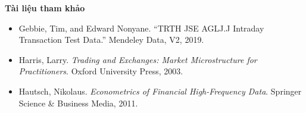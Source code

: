 \textbf{Tài liệu tham khảo}

\begin{itemize}
  \item Gebbie, Tim, and Edward Nonyane. ``TRTH JSE AGLJ.J Intraday Transaction Test Data.'' Mendeley Data, V2, 2019.
  \item Harris, Larry. \emph{Trading and Exchanges: Market Microstructure for Practitioners}. Oxford University Press, 2003.
  \item Hautsch, Nikolaus. \emph{Econometrics of Financial High-Frequency Data}. Springer Science \& Business Media, 2011.
\end{itemize}

